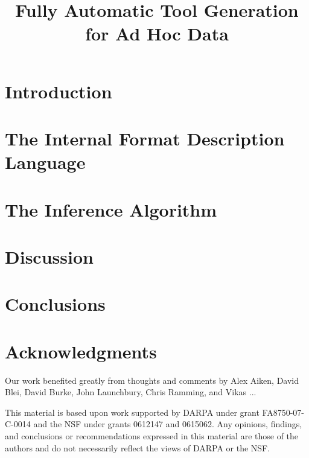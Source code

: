 \documentclass[nocopyrightspace]{sigplanconf}
\begin{document}
\title{Fully Automatic Tool Generation for Ad Hoc Data}

       {}
       {}
       {}
       {}


\maketitle{}

\begin{abstract}  

\end{abstract}

\section {Introduction}
\label{sec:intro}


\section{The Internal Format Description Language}
\label{sec:review}


\section{The Inference Algorithm}
\label{sec:inference}


\section {Discussion}
\label{sec:discussion}



\section{Conclusions}


\section*{Acknowledgments}

Our work benefited greatly from thoughts and comments by
Alex Aiken, David Blei, David Burke, John Launchbury, Chris Ramming, 
and Vikas ...

This material is based upon work 
supported by DARPA under grant FA8750-07-C-0014
and the NSF
   under grants 0612147 and 0615062.
Any opinions, findings, and conclusions or recommendations
   expressed in this material are those of the authors and do not
   necessarily reflect the views of DARPA or the NSF.





\end{document}
